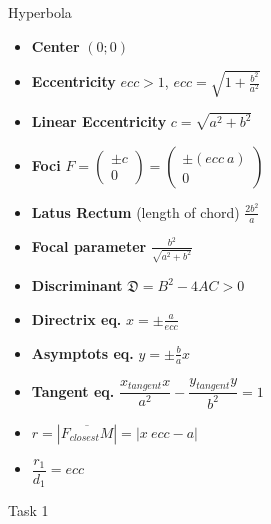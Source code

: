 \documentclass[aspectratio=169]{beamer}
\begin{document}
\begin{frame}[t]{Hyperbola}
\begin{multicols}{3}
\begin{itemize}
                \item \textbf{Center} $(0;0)$
                \item \textbf{Eccentricity} $ecc > 1$, $ecc = \sqrt{1 + \frac{b^2}{a^2}}$
                \item \textbf{Linear Eccentricity} $c = \sqrt{a^2+b^2}$
                \item \textbf{Foci} $F = \begin{pmatrix} \pm c\\ 0 \end{pmatrix} = \begin{pmatrix} \pm(ecc\ a)\\ 0 \end{pmatrix}$
                \item \textbf{Latus Rectum} (length of chord) $\frac{2b^2}{a}$
                \item \textbf{Focal parameter}  $\frac{b^2}{\sqrt{a^2+b^2}}$
                \item \textbf{Discriminant} $\mathfrak{D} = B^2 - 4AC > 0$
                \item \textbf{Directrix eq.} $x = \pm \frac{a}{ecc}$
                \item \textbf{Asymptots eq.} $y = \pm \frac{b}{a}x$
                \item \textbf{Tangent eq.} $\dfrac{x_{tangent} x}{a^2}-\dfrac{y_{tangent} y}{b^2}=1$
                \item $r = |\overline{F_{closest}M}|=|x\ ecc - a|$
                \item $\dfrac{r_1}{d_1}=ecc$
                \end{itemize}
        \end{multicols}
        \end{frame}

\begin{frame}[t]{Task 1}
    \framesubtitle{}
\end{frame}
\end{document}
